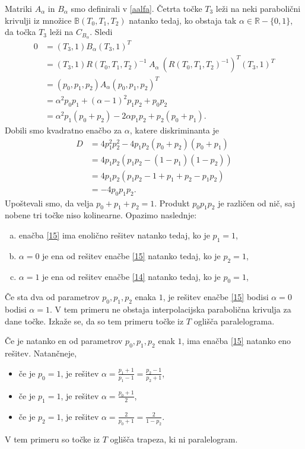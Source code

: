 \documentclass[mat1]{fmfdelo}
\newcommand{\R}{\mathbb R}
\newcommand{\B}{\mathbb B}
\newcommand{\al}{\alpha}
\begin{document}
\begin{dokaz}
Matriki $A_\al$ in $B_\al$ smo definirali v \ref{aalfa}. Četrta točke $T_3$ leži na neki parabolični krivulji iz množice  $\B(T_0, T_1, T_2)$ natanko tedaj, ko obstaja tak $\al \in \R - \{0,1 \}$, da točka $T_3$ leži na $C_{B_\al}$. Sledi
\begin{align}
0	&= (T_3, 1) B_\al (T_3, 1)^T \nonumber \\
	&= (T_3, 1) R(T_0, T_1, T_2)^{-1}\  A_{\al} \  (R(T_0, T_1, T_2)^{-1})^T (T_3, 1)^T \nonumber \\
	&= (p_0, p_1, p_2) A_\al (p_0, p_1, p_2)^T \nonumber \\
	&= \al^2 p_0 p_1 + (\al - 1)^2 p_1 p_2 + p_0 p_2 \label{14} \\ %
	&= \al^2 p_1(p_0 + p_2) - 2 \al p_1 p_2 + p_2(p_0 + p_1). \label{15}
\end{align}
Dobili smo kvadratno enačbo za $\al$, katere diskriminanta je 
\begin{align*}
D	&= 4 p_1^2 p_2^2 - 4 p_1 p_2(p_0 + p_2)(p_0 + p_1)  \\
	&= 4 p_1 p_2(p_1 p_2 - (1 - p_1)(1 - p_2))  \\
	&= 4 p_1 p_2(p_1 p_2 - 1 + p_1 + p_2 - p_1 p_2)  \\
	&= - 4 p_0 p_1 p_2. 
\end{align*}
Upoštevali smo, da velja $ p_0 + p_1 + p_2 = 1$. Produkt $p_0 p_1 p_2$ je različen od nič, saj nobene tri točke niso kolinearne. Opazimo naslednje:
\begin{enumerate}[a)]
\item enačba \eqref{15} ima enolično rešitev natanko tedaj, ko je $p_1 = 1$,
\item $\al = 0$ je ena od rešitev enačbe \eqref{15} natanko tedaj, ko je $p_2 = 1$, %
\item $\al = 1$ je ena od rešitev enačbe \eqref{14} natanko tedaj, ko je $p_0 = 1$, %
\end{enumerate}

Če sta dva od parametrov $p_0, p_1, p_2$ enaka $1$, je rešitev enačbe \eqref{15} bodisi $\al = 0$ bodisi $\al = 1$. V tem primeru ne obstaja interpolacijska parabolična krivulja za dane točke. Izkaže se, da so tem primeru točke iz $T$ oglišča paralelograma.

Če je natanko en od parametrov $p_0, p_1, p_2$ enak $1$, ima enačba \eqref{15} natanko eno rešitev. Natančneje, 
\begin{itemize}
\item če je $p_0 = 1$, je rešitev $\al = \frac{p_1 + 1}{p_1 - 1} = \frac{p_2 - 1}{p_2 + 1}$,
\item če je $p_1 = 1$, je rešitev $\al = \frac{p_0 + 1}{2}$,
\item če je $p_2 = 1$, je rešitev $\al = \frac{2}{p_0 + 1} = \frac{2}{1-p_2}$.
\end{itemize}
V tem primeru so točke iz $T$ oglišča trapeza, ki ni paralelogram.


\end{dokaz}
\end{document}
